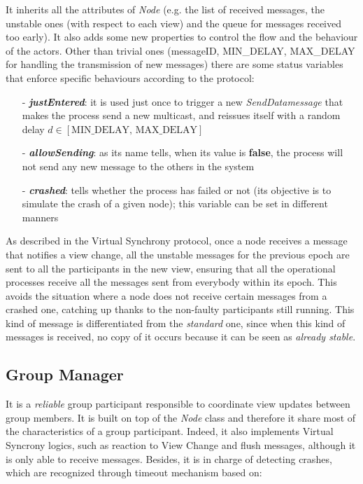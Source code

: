 \documentclass[11pt]{article}
\begin{document}
	It inherits all the attributes of \textit{Node} (e.g. the list of received messages, the unstable ones (with respect to each view) and the queue for messages received too early). It also adds some new properties to control the flow and the behaviour of the actors. Other than trivial ones (messageID, MIN\_DELAY, MAX\_DELAY for handling the transmission of new messages) there are some status variables that enforce specific behaviours according to the protocol:
	\begin{itemize}
		\item [-] \textit{\textbf{justEntered}}: it is used just once to trigger a new \textit{SendDatamessage} that makes the process send a new multicast, and reissues itself with a random delay $d \in [\text{MIN\_DELAY, MAX\_DELAY}]$
		\item [-] \textit{\textbf{allowSending}}: as its name tells, when its value is \textbf{false}, the process will not send any new message to the others in the system
		\item [-] \textit{\textbf{crashed}}: tells whether the process has failed or not (its objective is to simulate the crash of a given node); this variable can be set in different manners 
	\end{itemize}
	As described in the Virtual Synchrony protocol, once a node receives a message that notifies a view change, all the unstable messages for the previous epoch are sent to all the participants in the new view, ensuring that all the operational processes receive all the messages sent from everybody within its epoch. This avoids the situation where a node does not receive certain messages from a crashed one, catching up thanks to the non-faulty participants still running.
	This kind of message is differentiated from the \textit{standard} one, since when this kind of messages is received, no copy of it occurs because it can be seen as \textit{already stable}.
	
	\subsection{Group Manager}
	It is a \textit{reliable} group participant responsible to coordinate view updates between group members. It is built on top of the \textit{Node} class and therefore it share most of the characteristics of a group participant. Indeed, it also implements Virtual Syncrony logics, such as reaction to View Change and flush messages, although it is only able to receive messages. Besides, it is in charge of detecting crashes, which are recognized through timeout mechanism based on:
	
\end{document}
